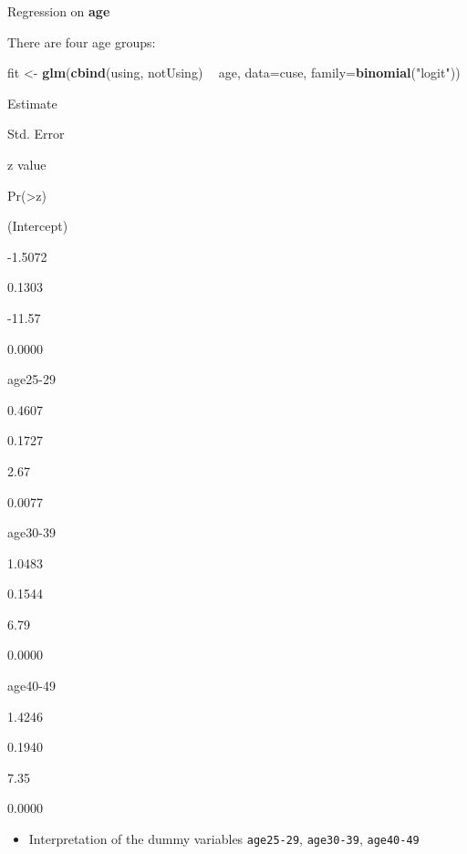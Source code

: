 \documentclass[
  ignorenonframetext,
]{beamer}
\newenvironment{Shaded}{\begin{snugshade}}{\end{snugshade}}
\newcommand{\DataTypeTok}[1]{\textcolor[rgb]{0.13,0.29,0.53}{#1}}
\newcommand{\KeywordTok}[1]{\textcolor[rgb]{0.13,0.29,0.53}{\textbf{#1}}}
\newcommand{\NormalTok}[1]{#1}
\newcommand{\OperatorTok}[1]{\textcolor[rgb]{0.81,0.36,0.00}{\textbf{#1}}}
\newcommand{\StringTok}[1]{\textcolor[rgb]{0.31,0.60,0.02}{#1}}
\providecommand{\tightlist}{%
  \setlength{\itemsep}{0pt}\setlength{\parskip}{0pt}}
\begin{document}
\begin{frame}[fragile]{Regression on \textbf{age}}
\protect\hypertarget{regression-on-age}{}

There are four age groups:

\begin{Shaded}
\begin{Highlighting}[]
\NormalTok{fit <-}\StringTok{ }\KeywordTok{glm}\NormalTok{(}\KeywordTok{cbind}\NormalTok{(using, notUsing) }\OperatorTok{~}\StringTok{ }\NormalTok{age, }
           \DataTypeTok{data=}\NormalTok{cuse, }\DataTypeTok{family=}\KeywordTok{binomial}\NormalTok{(}\StringTok{"logit"}\NormalTok{))}
\end{Highlighting}
\end{Shaded}

Estimate

Std. Error

z value

Pr(\textgreater\textbar z\textbar)

(Intercept)

-1.5072

0.1303

-11.57

0.0000

age25-29

0.4607

0.1727

2.67

0.0077

age30-39

1.0483

0.1544

6.79

0.0000

age40-49

1.4246

0.1940

7.35

0.0000

\begin{itemize}
\tightlist
\item
  Interpretation of the dummy variables \texttt{age25-29},
  \texttt{age30-39}, \texttt{age40-49}
\end{itemize}

\end{frame}
\end{document}
